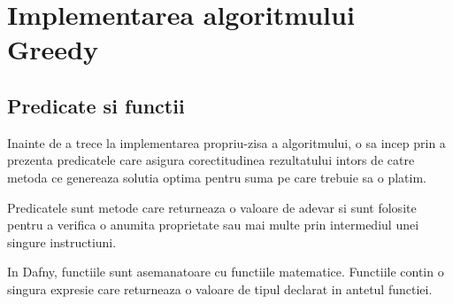 \section{Implementarea algoritmului Greedy}
\subsection{Predicate si functii }
Inainte de a trece la implementarea propriu-zisa a algoritmului, o sa incep prin a prezenta predicatele care asigura corectitudinea rezultatului intors de catre metoda ce genereaza solutia optima pentru suma pe care trebuie sa o platim. \par 
Predicatele sunt metode care returneaza o valoare de adevar si sunt folosite pentru a verifica o anumita proprietate sau mai multe prin intermediul unei singure instructiuni.
\par
In Dafny, functiile sunt asemanatoare cu functiile matematice. Functiile contin o singura expresie care returneaza o valoare de tipul declarat in antetul functiei.
\par
